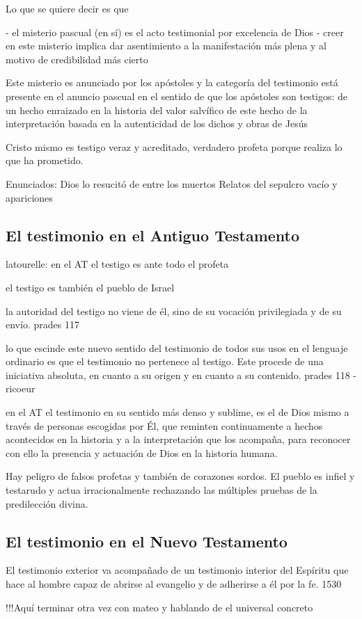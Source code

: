 Lo que se quiere decir es que

- el misterio pascual (en sí) es el acto testimonial por excelencia de Dios
- creer en este misterio implica dar asentimiento a la manifestación más plena y
al motivo de credibilidad más cierto

Este misterio es anunciado por los apóstoles y
la categoría del testimonio está presente en el
anuncio pascual en el sentido de que los apóstoles son testigos:
de un hecho enraizado en la historia
del valor salvífico de este hecho
de la interpretación basada en la autenticidad de los dichos y obras de Jesús

Cristo mismo es testigo veraz y acreditado, verdadero profeta porque realiza lo
que ha prometido.

Enunciados:
Dios lo resucitó de entre los muertos
Relatos del sepulcro vacío y apariciones

\subsection{El testimonio en el Antiguo Testamento}

  latourelle:
  en el AT el testigo es ante todo el
  profeta

  el testigo es también el pueblo de Israel

  la autoridad del testigo no viene de él, sino de su vocación privilegiada y de
  su envío. prades 117

  lo que escinde este nuevo sentido del testimonio de todos sus usos en el
  lenguaje ordinario es que el testimonio no pertenece al testigo. Este procede de
  una iniciativa absoluta, en cuanto a su origen y en cuanto a su contenido.
  prades 118 - ricoeur

  en el AT el testimonio en su sentido más denso y sublime, es el de Dios mismo a
  través de personas escogidas por Él, que reminten continuamente a hechos
  acontecidos en la historia y a la interpretación que los acompaña, para
  reconocer con ello la presencia y actuación de Dios en la historia humana.

  Hay peligro de falsos profetas y también de corazones sordos.
  El pueblo es infiel y testarudo y actua irracionalmente rechazando las múltiples
  pruebas de la predilección divina.

\subsection{El testimonio en el Nuevo Testamento}
  El testimonio exterior va acompañado de un testimonio interior del Espíritu que
  hace al hombre capaz de abrirse al evangelio y de adherirse a él por la fe. 1530


!!!Aquí terminar otra vez con mateo y hablando de el universal concreto
